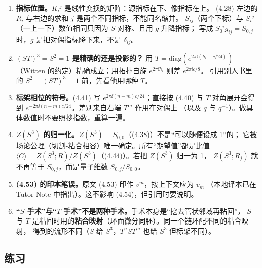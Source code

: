 \begin{enumerate}[leftmargin=2em]
\item \textbf{指标位置。}$K_i{}^j$ 是线性变换的矩阵：源指标在下、像指标在上。
(4.28) 左边的 $R_i$ 与右边的求和 $j$ 是两个不同指标，不能同名缩并。
$S_{ij}$（两个下标）与 $S_i{}^j$（一上一下）数值相同只因为 $S$ 对称、且用 $g$ 升降指标；
写成 $S_{0}{}^i g_{ij}=S_{0,j}$ 时，$g$ 是把对偶指标降下来，不是 $\delta_{ij}$。
\item \textbf{$(ST)^3=S^2=1$ 是精确的还是投影的？} 用 $T=\mathrm{diag}(e^{2\pi\ii(h_i-c/24)})$
（Witten 的约定）精确成立；用拓扑自旋 $e^{2\pi\ii h_i}$ 则差 $e^{2\pi\ii c/8}$。
引用别人书里的 $S^2=(ST)^3=1$ 前，先看他用哪种 $T$。
\item \textbf{标架相位的符号。}(4.41) 写 $e^{2\pi\ii(n-m)c/24}$；直接按 (4.40) 与
$T$ 对角展开会得到 $e^{-2\pi\ii(n+m)c/24}$。差别来自右端 $T^m$ 作用在对偶上
（以及 $q$ 与 $q^{-1}$）。做具体数值时不要照抄指数，重算一遍。
\item \textbf{$Z(S^3)$ 的归一化。}$Z(S^3)=S_{0,0}$（(4.38)）不是“可以随便设成 1”的；
它被场论公理（切割-粘合相容）唯一确定。所有“期望值”都是比值
$\langle C\rangle=Z(S^3;R)/Z(S^3)$（(4.44)）。若把 $Z(S^3)$ 归一为 1，
$Z(S^3;R_j)$ 就不再等于 $S_{0,j}$，而是量子维数 $S_{0,j}/S_{0,0}$。
\item \textbf{(4.53) 的印本笔误。}原文 (4.53) 印作 $v^m$，按上下文应为 $v_m$
（本地译本已在 Tutor Note 中指出）。这不影响 (4.54)，但引用时要说明。
\item \textbf{“$S$ 手术”与“$T$ 手术”不是两种手术。}手术本身是“挖去管状邻域再粘回”，
$S$ 与 $T$ 是粘回时用的\textbf{粘合映射}（环面微分同胚）。同一个链环配不同的粘合映射，
得到的流形不同（$S$ 给 $S^3$，$T^nST^m$ 也给 $S^3$ 但标架不同）。
\end{enumerate}

\subsection{练习}

